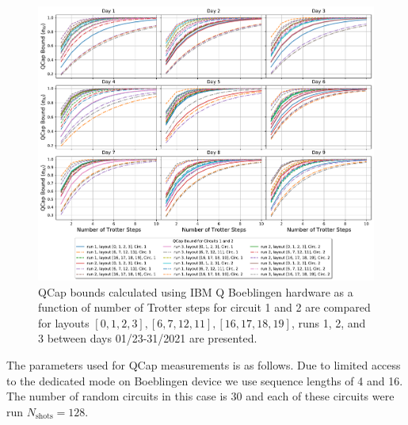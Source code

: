 \begin{figure}[ht!]
    \includegraphics[scale=0.5]{QCapBoundForEachDay_Circ1andCirc2.pdf}
    \caption{QCap bounds calculated using IBM Q Boeblingen hardware as a function of number of Trotter steps for circuit 1 and 2 are compared for layouts $[0,1,2,3],[6,7,12,11],[16,17,18,19]$, runs 1, 2, and 3 between days 01/23-31/2021 are presented.}
    \label{fig:QCapCirc1and2}
\end{figure}

The parameters used for QCap measurements is as follows. Due to limited access to the dedicated mode on Boeblingen device we use sequence lengths of 4 and 16. The number of random circuits in this case is 30 and each of these circuits were run $N_{\text{shots}}=128$. 

